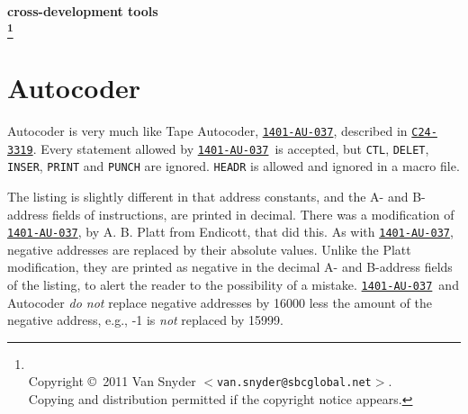 \documentclass[12pt,twoside]{article}
\begin{document}
\parindent 0pt
\parskip 4.5pt

\newcommand{\DATE}{2011 November 14}
\makeatletter
\newcommand{\ps@footer}{%
  \renewcommand{\@oddhead}{}%
  \renewcommand{\@evenhead}{}%
  \renewcommand{\@oddfoot}{1401 cross-development tools\hfill %
    \DATE\hfill\thepage~of \pageref{lastpage}}%
  \renewcommand{\@evenfoot}{\thepage~of \pageref{lastpage}\hfill%
    \DATE\hfill 1401 cross-development tools}%
}%
\makeatother

\newcommand\inp[1]{\hangindent=#1\hangafter=0\relax}

\pagestyle{footer}

\renewcommand{\thefootnote}{}
\begin{centering}
\Large\bfseries{} cross-development tools\\
\footnote{\makeatletter\parindent 0pt\\[-5pt]
Copyright \copyright\ 2011 Van Snyder $<${\tt van.snyder@sbcglobal.net}$>$.
\\
Copying and distribution permitted if the copyright notice appears.
}
\end{centering}

\newcommand{\bits}[1]{http://www.bitsavers.org/pdf/ibm/14#1x/}
\newcommand{\AUT}{1401-AU-037}
\newcommand{\REF}[2]{\hyperref{\bits{0}#1}{}{}{{\tt #2}}}
\newcommand{\AU}{\REF{C24-3319-0_1401_tapeAutocod.pdf}{\AUT}}
\newcommand{\IV}[2]{\hyperref{\bits{4}#1}{}{}{{\tt #2}}} %

\section{Autocoder}

Autocoder is very much like Tape Autocoder, \AU, described in
\REF{C24-3319-0_1401_tapeAutocod.pdf}{C24-3319}.  Every statement allowed
by \AU\ is accepted, but {\tt CTL}, {\tt DELET}, {\tt INSER}, {\tt PRINT}
and {\tt PUNCH} are ignored.  {\tt HEADR} is allowed and ignored in a
macro file.

The listing is slightly different in that address constants, and the A-
and B-address fields of instructions, are printed in decimal.  There was a
modification of \AU, by A. B. Platt from Endicott, that did this.  As with
\AU, negative addresses are replaced by their absolute values.  Unlike the
Platt modification, they are printed as negative in the decimal A- and
B-address fields of the listing, to alert the reader to the possibility of
a mistake.  \AU\ and Autocoder \emph{do not} replace negative addresses by
16000 less the amount of the negative address, e.g., -1 is \emph{not}
replaced by 15999.
\end{document}
